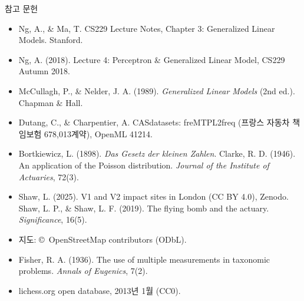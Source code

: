\documentclass[aspectratio=169,11pt,t]{beamer}
\newcommand{\paperlink}[1]{\href{#1}{\textcolor{ksablue}{\faLink}}}
\begin{document}
\begin{frame}{참고 문헌}
\vfill
\footnotesize
\begin{itemize}
\item Ng, A., \& Ma, T. CS229 Lecture Notes, Chapter 3: Generalized Linear Models. Stanford. \paperlink{https://cs229.stanford.edu/main_notes.pdf}
\item Ng, A. (2018). Lecture 4: Perceptron \& Generalized Linear Model, CS229 Autumn 2018. \paperlink{https://www.youtube.com/watch?v=iZTeva0WSTQ}
\item McCullagh, P., \& Nelder, J. A. (1989). \textit{Generalized Linear Models} (2nd ed.). Chapman \& Hall.
\item Dutang, C., \& Charpentier, A. CASdatasets: freMTPL2freq (프랑스 자동차 책임보험 678,013계약), OpenML 41214. \paperlink{https://www.openml.org/d/41214}
\item Bortkiewicz, L. (1898). \textit{Das Gesetz der kleinen Zahlen}. \quad Clarke, R. D. (1946). An application of the Poisson distribution. \textit{Journal of the Institute of Actuaries}, 72(3).
\item Shaw, L. (2025). V1 and V2 impact sites in London (CC BY 4.0), Zenodo. \paperlink{https://zenodo.org/records/14883986} \quad Shaw, L. P., \& Shaw, L. F. (2019). The flying bomb and the actuary. \textit{Significance}, 16(5).
\item 지도: \copyright\ OpenStreetMap contributors (ODbL). \paperlink{https://www.openstreetmap.org/copyright}
\item Fisher, R. A. (1936). The use of multiple measurements in taxonomic problems. \textit{Annals of Eugenics}, 7(2).
\item lichess.org open database, 2013년 1월 (CC0). \paperlink{https://database.lichess.org}
\end{itemize}
\vfill
{}
\end{frame}
\end{document}
